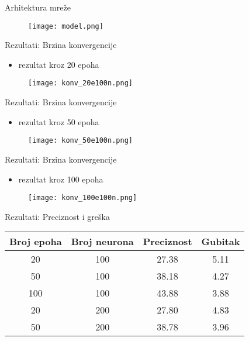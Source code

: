 \documentclass[table]{beamer}
\begin{document}
\begin{frame}{Arhitektura mreže}
    \begin{figure}
        \centering
        \texttt{[image: model.png]}
    \end{figure}
\end{frame}

\begin{frame}{Rezultati: Brzina konvergencije}
\begin{itemize}
    \item rezultat kroz 20 epoha
\end{itemize}
\begin{figure}
    \centering
    \texttt{[image: konv\_20e100n.png]}
\end{figure}
    
\end{frame}

\begin{frame}{Rezultati: Brzina konvergencije}
\begin{itemize}
    \item rezultat kroz 50 epoha
\end{itemize}
\begin{figure}
    \centering
    \texttt{[image: konv\_50e100n.png]}
\end{figure}
    
\end{frame}

\begin{frame}{Rezultati: Brzina konvergencije}
\begin{itemize}
    \item rezultat kroz 100 epoha
\end{itemize}
\begin{figure}
    \centering
    \texttt{[image: konv\_100e100n.png]}
\end{figure}
    
\end{frame}


\begin{frame}{Rezultati: Preciznost i greška}
\begin{table}[]
 
    \begin{tabular}{|| c c c c ||}
    \hline
    \rowcolor{lightgray!50}Broj epoha & Broj neurona & Preciznost & Gubitak \\
    \hline\hline
    \rowcolor{orange!50} 20 & 100 & 27.38 & 5.11 \\
    \rowcolor{orange!70} 50 & 100 & 38.18  & 4.27 \\
    \rowcolor{orange}100 & 100 & 43.88 & 3.88 \\
    \rowcolor{orange!50}20 & 200 & 27.80 & 4.83 \\
    \rowcolor{orange!70} 50 & 200 & 38.78 & 3.96 \\
     \hline
    \end{tabular}
    
\end{table}
\end{frame}
\end{document}
